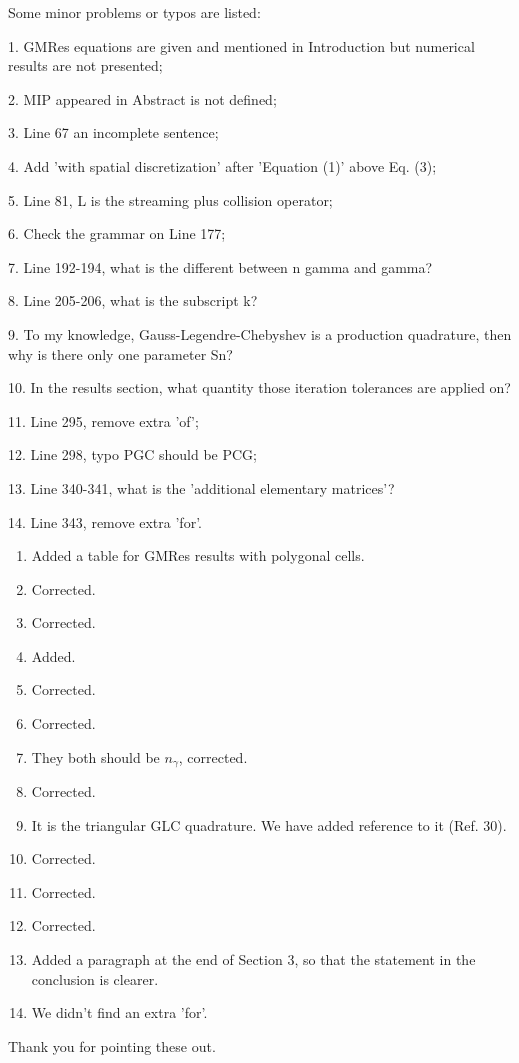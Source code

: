 \documentclass{article}
\begin{document}
{
\color{blue}
\noindent
Some minor problems or typos are listed:

1. GMRes equations are given and mentioned in Introduction but numerical results are not presented;

2. MIP appeared in Abstract is not defined;

3. Line 67 an incomplete sentence;

4. Add 'with spatial discretization' after 'Equation (1)' above Eq. (3);

5. Line 81, L is the streaming plus collision operator;

6. Check the grammar on Line 177;

7. Line 192-194, what is the different between n gamma and gamma?

8. Line 205-206, what is the subscript k?

9. To my knowledge, Gauss-Legendre-Chebyshev is a production quadrature, then why is there only one parameter Sn?

10. In the results section, what quantity those iteration tolerances are applied on?

11. Line 295, remove extra 'of';

12. Line 298, typo PGC should be PCG;

13. Line 340-341, what is the 'additional elementary matrices'?

14. Line 343, remove extra 'for'.}



\begin{enumerate}
\item Added a table for GMRes results with polygonal cells.
\item Corrected.
\item Corrected.
\item Added.
\item Corrected.
\item Corrected.
\item They both should be $n_\gamma$, corrected.
\item Corrected.
\item It is the triangular GLC quadrature. We have added reference to it (Ref. 30).
\item Corrected.
\item Corrected.
\item Corrected.
\item Added a paragraph at the end of Section 3, so that the statement in the conclusion is clearer.
\item We didn't find an extra 'for'.
\end{enumerate}

\noindent 
Thank you for pointing these out.
\end{document}
